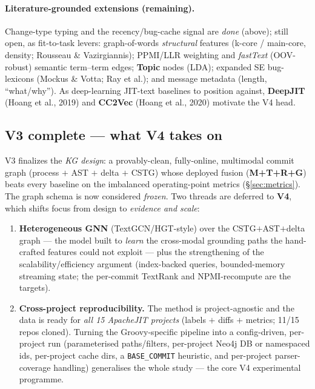 \documentclass[11pt,a4paper]{article}
\newcommand{\code}[1]{\texttt{#1}}
\begin{document}
	\paragraph{Literature-grounded extensions (remaining).} Change-type typing and the
	recency/bug-cache signal are \emph{done} (above); still open, as fit-to-task levers:
	graph-of-words \emph{structural} features (k-core / main-core, density; Rousseau \&
	Vazirgiannis); PPMI/LLR weighting and \emph{fastText} (OOV-robust) semantic
	term--term edges; \textbf{Topic} nodes (LDA); expanded SE bug-lexicons (Mockus \&
	Votta; Ray et al.); and message metadata (length, ``what/why''). As deep-learning
	JIT-text baselines to position against, \textbf{DeepJIT} (Hoang et al., 2019) and
	\textbf{CC2Vec} (Hoang et al., 2020) motivate the V4 head.

	\subsection{V3 complete --- what V4 takes on}\label{sec:v4next}
	V3 finalizes the \emph{KG design}: a provably-clean, fully-online, multimodal
	commit graph (process $+$ AST $+$ delta $+$ CSTG) whose deployed fusion
	(\textbf{M+T+R+G}) beats every baseline on the imbalanced operating-point metrics
	(\S\ref{sec:metrics}). The graph schema is now considered \emph{frozen}. Two threads
	are deferred to \textbf{V4}, which shifts focus from design to \emph{evidence and
	scale}:
	\begin{enumerate}[nosep]
		\item \textbf{Heterogeneous GNN} (TextGCN/HGT-style) over the CSTG$+$AST$+$delta
		graph --- the model built to \emph{learn} the cross-modal grounding paths the
		hand-crafted features could not exploit --- plus the strengthening of the
		scalability/efficiency argument (index-backed queries, bounded-memory streaming
		state; the per-commit TextRank and NPMI-recompute are the targets).
		\item \textbf{Cross-project reproducibility.} The method is project-agnostic and
		the data is ready for \emph{all 15 ApacheJIT projects} (labels $+$ diffs $+$
		metrics; 11/15 repos cloned). Turning the Groovy-specific pipeline into a
		config-driven, per-project run (parameterised paths/filters, per-project Neo4j DB
		or namespaced ids, per-project cache dirs, a \code{BASE\_COMMIT} heuristic, and
		per-project parser-coverage handling) generalises the whole study --- the core V4
		experimental programme.
	\end{enumerate}
\end{document}
